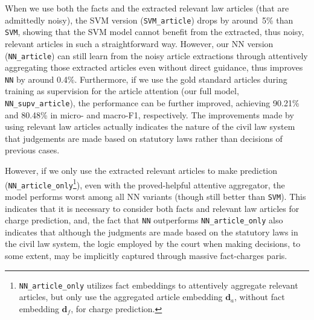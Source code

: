 
When we use both the facts and the extracted relevant law articles (that are admittedly noisy),
the SVM version (\texttt{SVM\_article}) drops by around~5\% than \texttt{SVM}, showing that the SVM model 
cannot benefit from the extracted, thus noisy, relevant articles in such a straightforward way.
However, our NN version (\texttt{NN\_article}) can still learn from  the noisy article extractions through 
attentively aggregating those extracted articles even without direct guidance,
thus improves \texttt{NN} by around 0.4\%.
Furthermore, if we use the gold standard articles during training as supervision for the 
article attention (our full model, \texttt{NN\_supv\_article}), the performance can be further improved, achieving 
90.21\% and 80.48\% in micro- and macro-F1, respectively.
The improvements made by using relevant law articles actually indicates the nature of the civil law system that judgements are made based on statutory laws rather than decisions of previous cases.

However, if we only use the extracted relevant articles to make prediction (\texttt{NN\_article\_only}\footnote{
\texttt{NN\_article\_only} utilizes fact embeddings to attentively aggregate relevant articles, but only use 
the aggregated article embedding $\mathbf{d}_a$, without fact embedding  $\mathbf{d}_f$,  for charge prediction.}),
even with the proved-helpful attentive aggregator, the model performs worst among all NN 
variants (though still better than \texttt{SVM}). This indicates that  it is necessary to consider both facts and 
relevant law articles for charge prediction, and,
the fact that \texttt{NN} outperforms \texttt{NN\_article\_only} also indicates that although the judgments are made based on the statutory laws in the civil law system,
the logic %
employed by the court when making decisions,
to some extent, may be implicitly captured through massive fact-charges paris.



